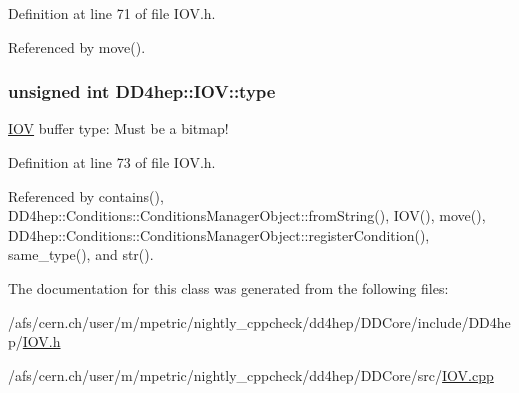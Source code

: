 Definition at line 71 of file IOV.h.

Referenced by move().\hypertarget{class_d_d4hep_1_1_i_o_v_a497f2859ca7cb011151ae6b977b50aa0}{
\subsubsection[{type}]{\setlength{\rightskip}{0pt plus 5cm}unsigned int {\bf DD4hep::IOV::type}}}
\label{class_d_d4hep_1_1_i_o_v_a497f2859ca7cb011151ae6b977b50aa0}


\hyperlink{class_d_d4hep_1_1_i_o_v}{IOV} buffer type: Must be a bitmap! 

Definition at line 73 of file IOV.h.

Referenced by contains(), DD4hep::Conditions::ConditionsManagerObject::fromString(), IOV(), move(), DD4hep::Conditions::ConditionsManagerObject::registerCondition(), same\_\-type(), and str().

The documentation for this class was generated from the following files:\begin{DoxyCompactItemize}
\item 
/afs/cern.ch/user/m/mpetric/nightly\_\-cppcheck/dd4hep/DDCore/include/DD4hep/\hyperlink{_i_o_v_8h}{IOV.h}\item 
/afs/cern.ch/user/m/mpetric/nightly\_\-cppcheck/dd4hep/DDCore/src/\hyperlink{_i_o_v_8cpp}{IOV.cpp}\end{DoxyCompactItemize}
